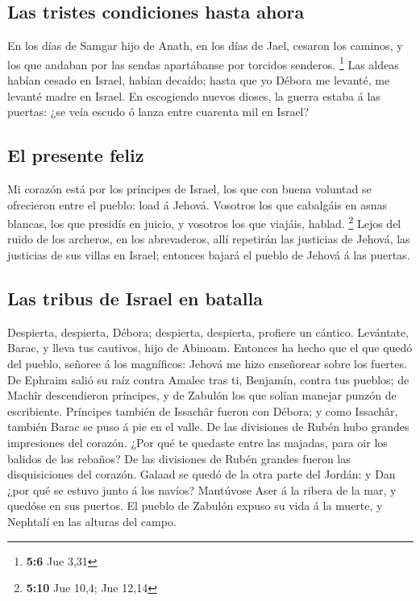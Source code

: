 \hypertarget{las-tristes-condiciones-hasta-ahora}{%
\subsection{Las tristes condiciones hasta
ahora}\label{las-tristes-condiciones-hasta-ahora}}

 En los días de Samgar hijo de Anath, en los días de Jael,
cesaron los caminos, y los que andaban por las sendas apartábanse por
torcidos senderos. \footnote{\textbf{5:6} Jue 3,31}  Las
aldeas habían cesado en Israel, habían decaído; hasta que yo Débora me
levanté, me levanté madre en Israel.  En escogiendo nuevos
dioses, la guerra estaba á las puertas: ¿se veía escudo ó lanza entre
cuarenta mil en Israel?

\hypertarget{el-presente-feliz}{%
\subsection{El presente feliz}\label{el-presente-feliz}}

 Mi corazón está por los príncipes de Israel, los que con
buena voluntad se ofrecieron entre el pueblo: load á Jehová.
 Vosotros los que cabalgáis en asnas blancas, los que
presidís en juicio, y vosotros los que viajáis, hablad. \footnote{\textbf{5:10}
  Jue 10,4; Jue 12,14}  Lejos del ruido de los archeros, en
los abrevaderos, allí repetirán las justicias de Jehová, las justicias
de sus villas en Israel; entonces bajará el pueblo de Jehová á las
puertas.

\hypertarget{las-tribus-de-israel-en-batalla}{%
\subsection{Las tribus de Israel en
batalla}\label{las-tribus-de-israel-en-batalla}}

 Despierta, despierta, Débora; despierta, despierta,
profiere un cántico. Levántate, Barac, y lleva tus cautivos, hijo de
Abinoam.  Entonces ha hecho que el que quedó del pueblo,
señoree á los magníficos: Jehová me hizo enseñorear sobre los fuertes.
 De Ephraim salió su raíz contra Amalec tras ti, Benjamín,
contra tus pueblos; de Machîr descendieron príncipes, y de Zabulón los
que solían manejar punzón de escribiente.  Príncipes
también de Issachâr fueron con Débora; y como Issachâr, también Barac se
puso á pie en el valle. De las divisiones de Rubén hubo grandes
impresiones del corazón.  ¿Por qué te quedaste entre las
majadas, para oir los balidos de los rebaños? De las divisiones de Rubén
grandes fueron las disquisiciones del corazón.  Galaad se
quedó de la otra parte del Jordán: y Dan ¿por qué se estuvo junto á los
navíos? Mantúvose Aser á la ribera de la mar, y quedóse en sus puertos.
 El pueblo de Zabulón expuso su vida á la muerte, y
Nephtalí en las alturas del campo.

